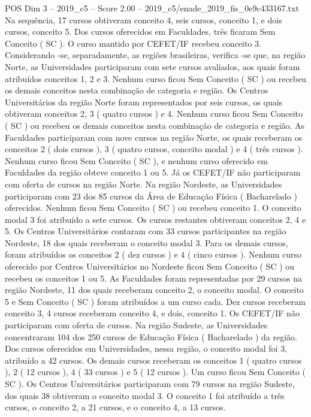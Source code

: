 \begin{textsample}{POS Dim 3 – 2019\_c5 – Score 2.00 – 2019\_c5/enade\_2019\_fis\_0e9c433167.txt}
Na sequência, 17 cursos obtiveram conceito 4, seis cursos, conceito 1, e dois cursos, conceito 5.
Dos cursos oferecidos em Faculdades, três ficaram Sem Conceito ( SC ).
O curso mantido por CEFET/IF recebeu conceito 3.
Considerando -se, separadamente, as regiões brasileiras, verifica -se que, na região Norte, as Universidades participaram com sete cursos avaliados, aos quais foram atribuídos conceitos 1, 2 e 3.
Nenhum curso ficou Sem Conceito ( SC ) ou recebeu os demais conceitos nesta combinação de categoria e região.
Os Centros Universitários da região Norte foram representados por seis cursos, os quais obtiveram conceitos 2, 3 ( quatro cursos ) e 4.
Nenhum curso ficou Sem Conceito ( SC ) ou recebeu os demais conceitos nesta combinação de categoria e região.
As Faculdades participaram com nove cursos na região Norte, os quais receberam os conceitos 2 ( dois cursos ), 3 ( quatro cursos, conceito modal ) e 4 ( três cursos ).
Nenhum curso ficou Sem Conceito ( SC ), e nenhum curso oferecido em Faculdades da região obteve conceito 1 ou 5.
Já os CEFET/IF não participaram com oferta de cursos na região Norte.
Na região Nordeste, as Universidades participaram com 23 dos 85 cursos da Área de Educação Física ( Bacharelado ) oferecidos.
Nenhum ficou Sem Conceito ( SC ) ou recebeu conceito 1.
O conceito modal 3 foi atribuído a sete cursos.
Os cursos restantes obtiveram conceitos 2, 4 e 5.
Os Centros Universitários contaram com 33 cursos participantes na região Nordeste, 18 dos quais receberam o conceito modal 3.
Para os demais cursos, foram atribuídos os conceitos 2 ( dez cursos ) e 4 ( cinco cursos ).
Nenhum curso oferecido por Centros Universitários no Nordeste ficou Sem Conceito ( SC ) ou recebeu os conceitos 1 ou 5.
As Faculdades foram representadas por 29 cursos na região Nordeste, 11 dos quais receberam conceito 2, o conceito modal.
O conceito 5 e Sem Conceito ( SC ) foram atribuídos a um curso cada.
Dez cursos receberam conceito 3, 4 cursos receberam conceito 4, e dois, conceito 1.
Os CEFET/IF não participaram com oferta de cursos.
Na região Sudeste, as Universidades concentraram 104 dos 250 cursos de Educação Física ( Bacharelado ) da região.
Dos cursos oferecidos em Universidades, nessa região, o conceito modal foi 3, atribuído a 42 cursos.
Os demais cursos receberam os conceitos 1 ( quatro cursos ), 2 ( 12 cursos ), 4 ( 33 cursos ) e 5 ( 12 cursos ).
Um curso ficou Sem Conceito ( SC ).
Os Centros Universitários participaram com 79 cursos na região Sudeste, dos quais 38 obtiveram o conceito modal 3.
O conceito 1 foi atribuído a três cursos, o conceito 2, a 21 cursos, e o conceito 4, a 13 cursos.

\end{textsample}

